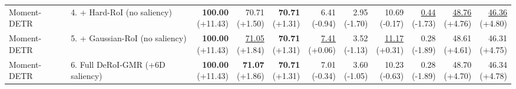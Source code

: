 \documentclass{article}
\begin{document}
{\begin{tabular}{llrrrrrrrrr}
Moment-DETR & 4. + Hard-RoI (no saliency) & \shortstack{\textbf{100.00} \\ {\scriptsize (+11.43)}} & \shortstack{70.71 \\ {\scriptsize (+1.50)}} & \shortstack{\textbf{70.71} \\ {\scriptsize (+1.31)}} & \shortstack{6.41 \\ {\scriptsize (-0.94)}} & \shortstack{2.95 \\ {\scriptsize (-1.70)}} & \shortstack{10.69 \\ {\scriptsize (-0.17)}} & \shortstack{\underline{0.44} \\ {\scriptsize (-1.73)}} & \shortstack{\underline{48.76} \\ {\scriptsize (+4.76)}} & \shortstack{\underline{46.36} \\ {\scriptsize (+4.80)}} \\
Moment-DETR & 5. + Gaussian-RoI (no saliency) & \shortstack{\textbf{100.00} \\ {\scriptsize (+11.43)}} & \shortstack{\underline{71.05} \\ {\scriptsize (+1.84)}} & \shortstack{\textbf{70.71} \\ {\scriptsize (+1.31)}} & \shortstack{\underline{7.41} \\ {\scriptsize (+0.06)}} & \shortstack{3.52 \\ {\scriptsize (-1.13)}} & \shortstack{\underline{11.17} \\ {\scriptsize (+0.31)}} & \shortstack{0.28 \\ {\scriptsize (-1.89)}} & \shortstack{48.61 \\ {\scriptsize (+4.61)}} & \shortstack{46.31 \\ {\scriptsize (+4.75)}} \\
Moment-DETR & 6. Full DeRoI-GMR (+6D saliency) & \shortstack{\textbf{100.00} \\ {\scriptsize (+11.43)}} & \shortstack{\textbf{71.07} \\ {\scriptsize (+1.86)}} & \shortstack{\textbf{70.71} \\ {\scriptsize (+1.31)}} & \shortstack{7.01 \\ {\scriptsize (-0.34)}} & \shortstack{3.60 \\ {\scriptsize (-1.05)}} & \shortstack{10.23 \\ {\scriptsize (-0.63)}} & \shortstack{0.28 \\ {\scriptsize (-1.89)}} & \shortstack{48.70 \\ {\scriptsize (+4.70)}} & \shortstack{46.34 \\ {\scriptsize (+4.78)}} \\

\end{tabular}}
\end{document}
